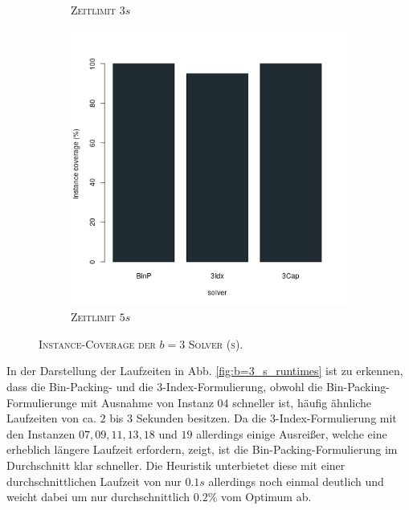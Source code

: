 \begin{figure}[H]
\begin{subfigure}[b]{0.3\textwidth}
\caption{\textsc{Zeitlimit} $3s$}
\label{fig:instance_coverage_b=3_s_b}
\end{subfigure}
\hfill
\begin{subfigure}[b]{0.3\textwidth}
\centering
\includegraphics[width=1.2\textwidth]{img/solver_instance_coverage_b=3_s_5s.png}
\caption{\textsc{Zeitlimit} $5s$}
\label{fig:instance_coverage_b=3_s_c}
\end{subfigure}

\caption{\textsc{Instance-Coverage der $b = 3$ Solver (s)}.}
\label{fig:instance_coverage_b=3_s}
\end{figure}

In der Darstellung der Laufzeiten in Abb. \ref{fig:b=3_s_runtimes} ist zu erkennen, dass die Bin-Packing-
und die 3-Index-Formulierung, obwohl die Bin-Packing-Formulierunge mit Ausnahme von Instanz $04$ schneller ist,
häufig ähnliche Laufzeiten von ca. $2$ bis $3$ Sekunden besitzen.
Da die 3-Index-Formulierung mit den Instanzen $07, 09, 11, 13, 18$ und $19$ allerdings einige Ausreißer,
welche eine erheblich längere Laufzeit erfordern, zeigt, ist die Bin-Packing-Formulierung im Durchschnitt klar schneller.
Die Heuristik unterbietet diese mit einer durchschnittlichen Laufzeit von nur $0.1s$ allerdings noch einmal deutlich
und weicht dabei um nur durchschnittlich $0.2 \%$ vom Optimum ab.

